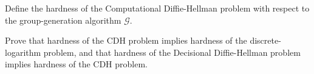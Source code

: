 \documentclass[a4paper,10pt,landscape,twocolumn]{scrartcl}
\begin{document}
%




\begin{exercise}
\begin{subex}
Define the hardness of the Computational Diffie-Hellman problem with respect to the group-generation algorithm $\mathcal{G}$. %
\end{subex}
\begin{subex}
Prove that hardness of the CDH problem implies hardness of the discrete-logarithm problem, and that hardness of the Decisional Diffie-Hellman problem implies hardness of the CDH problem.
\end{subex}
\end{exercise}
\end{document}
